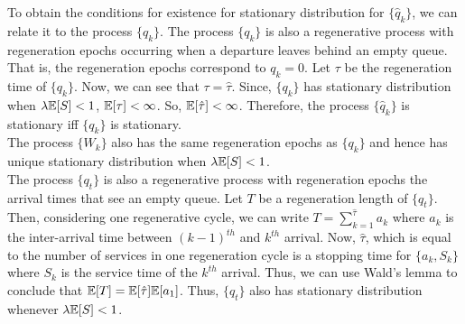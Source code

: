 \documentclass[all-lectures.tex]{subfiles}
\begin{document}
\indent To obtain the conditions for existence for stationary distribution for $\{\hat{q}_k\}$, we can relate it to the process $\{q_k\}$. The process $\{q_k\}$ is also a regenerative process with regeneration epochs occurring when a departure leaves behind an empty queue. That is, the regeneration epochs correspond to $q_k = 0$. Let $\tau$ be the regeneration time of $\{q_k\}$. Now, we can see that $\tau = \hat{\tau}$. Since, $\{q_k\}$ has stationary distribution when $\lambda \mathbb{E}[S] < 1$, $\mathbb{E}[\tau] < \infty$. So, $\mathbb{E}[\hat{\tau}] < \infty$. Therefore, the process $\{\hat{q}_k\}$ is stationary iff $\{q_k\}$ is stationary. \\
\indent The process $\{W_k\}$ also has the same regeneration epochs as $\{q_k\}$ and hence has unique stationary distribution when $\lambda\mathbb{E}[S] < 1$.\\
\indent The process $\{q_t\}$ is also a regenerative process with regeneration epochs the arrival times that see an empty queue. Let $T$ be a regeneration length of $\{q_t\}$. Then, considering one regenerative cycle, we can write $T = \sum_{k = 1}^{\hat{\tau}} a_k$ where $a_k$ is the inter-arrival time between $(k-1)^{th}$ and $k^{th}$ arrival. Now, $\hat{\tau}$, which is equal to the number of services in one regeneration cycle is a stopping time for $\{a_k,S_k\}$ where $S_k$ is the service time of the $k^{th}$ arrival. Thus, we can use Wald's lemma to conclude that $\mathbb{E}[T] = \mathbb{E}[\hat{\tau}] \mathbb{E}[a_1]$. Thus, $\{q_t\}$ also has stationary distribution whenever $\lambda\mathbb{E}[S] < 1$.
\end{document}
